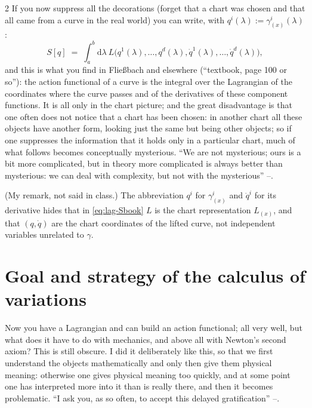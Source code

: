 \begin{paracol}{2}
If you now suppress all the decorations (forget that a chart was chosen and that all came from a curve in the real world) you can write, with $q^i(\lambda):=\gamma^i_{(x)}(\lambda)$:
\begin{equation}\label{eq:lag-Sbook}
  S[q]\;=\;\int_a^b\mathrm d\lambda\ L\bigl(q^1(\lambda),\dots,q^d(\lambda),\dot q^1(\lambda),\dots,\dot q^d(\lambda)\bigr),
\end{equation}
and this is what you find in Flie{\ss}bach and elsewhere (``textbook, page 100 or so''): the action functional of a curve is the integral over the Lagrangian of the coordinates where the curve passes and of the derivatives of these component functions. It is all only in the chart picture; and the great disadvantage is that one often does not notice that a chart has been chosen: in another chart all these objects have another form, looking just the same but being other objects; so if one suppresses the information that it holds only in a particular chart, much of what follows becomes conceptually mysterious. ``We are not mysterious; ours is a bit more complicated, but in theory more complicated is always better than mysterious: we can deal with complexity, but not with the mysterious'' --.

\begin{coursenote}\label{cn:lag-warn}
(My remark, not said in class.) The abbreviation $q^i$ for $\gamma^i_{(x)}$ and $\dot q^i$ for its derivative hides that in \eqref{eq:lag-Sbook} $L$ is the chart representation $L_{(x)}$, and that $(q,\dot q)$ are the chart coordinates of the lifted curve, not independent variables unrelated to $\gamma$.
\end{coursenote}

\section{Goal and strategy of the calculus of variations}\label{sec:lag-strategy}

Now you have a Lagrangian and can build an action functional; all very well, but what does it have to do with mechanics, and above all with Newton's second axiom? This is still obscure. I did it deliberately like this, so that we first understand the objects mathematically and only then give them physical meaning: otherwise one gives physical meaning too quickly, and at some point one has interpreted more into it than is really there, and then it becomes problematic. ``I ask you, as so often, to accept this delayed gratification'' --.


\end{paracol}
